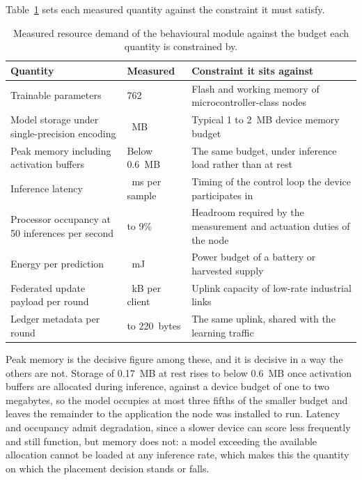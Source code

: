 Table~\ref{tab:res-budget} sets each measured quantity against the constraint it must satisfy.

\begin{table}[!htbp]
  \centering
  \footnotesize
  \setlength{\tabcolsep}{5pt}
  \renewcommand{\arraystretch}{1.3}
  \caption{Measured resource demand of the behavioural module against the budget each quantity is constrained by.}
  \label{tab:res-budget}
  \begin{tabularx}{\textwidth}{@{}
      >{\raggedright\arraybackslash}p{4.4cm}
      >{\raggedright\arraybackslash}p{3.0cm}
      >{\raggedright\arraybackslash}X@{}}
    \toprule
    \textbf{Quantity} & \textbf{Measured} & \textbf{Constraint it sits against} \\
    \midrule
    Trainable parameters & 41{,}762 & Flash and working memory of microcontroller-class nodes \\
    Model storage under single-precision encoding & 0.17~MB & Typical 1 to 2~MB device memory budget \\
    Peak memory including activation buffers & Below 0.6~MB & The same budget, under inference load rather than at rest \\
    Inference latency & 3.1~ms per sample & Timing of the control loop the device participates in \\
    Processor occupancy at 50 inferences per second & 6 to 9\% & Headroom required by the measurement and actuation duties of the node \\
    Energy per prediction & 0.42~mJ & Power budget of a battery or harvested supply \\
    Federated update payload per round & 167~kB per client & Uplink capacity of low-rate industrial links \\
    Ledger metadata per round & 180 to 220~bytes & The same uplink, shared with the learning traffic \\
    \bottomrule
  \end{tabularx}
\end{table}

Peak memory is the decisive figure among these, and it is decisive in a way the others are not. Storage of 0.17~MB at rest rises to below 0.6~MB once activation buffers are allocated during inference, against a device budget of one to two megabytes, so the model occupies at most three fifths of the smaller budget and leaves the remainder to the application the node was installed to run. Latency and occupancy admit degradation, since a slower device can score less frequently and still function, but memory does not: a model exceeding the available allocation cannot be loaded at any inference rate, which makes this the quantity on which the placement decision stands or falls.

